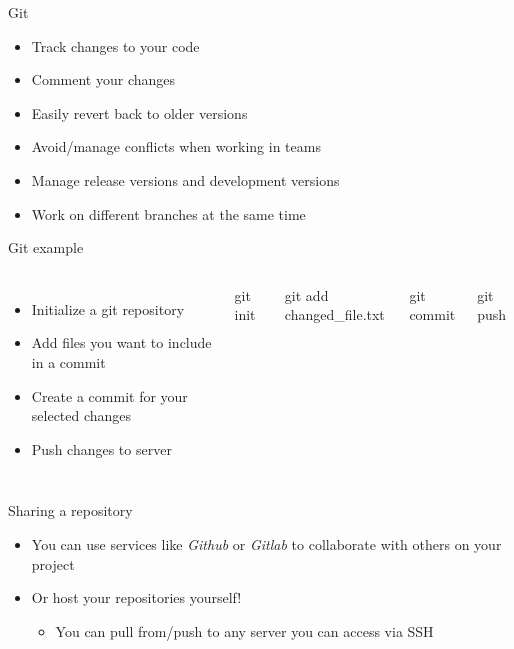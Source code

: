     \begin{frame}[t,fragile]{Git}
        \begin{itemize}
            \item{Track changes to your code}
            \item{Comment your changes}
            \item{Easily revert back to older versions}
            \item{Avoid/manage conflicts when working in teams}
            \item{Manage release versions and development versions}
            \item{Work on different branches at the same time}
        \end{itemize}
    \end{frame}

    \begin{frame}[t,fragile]{Git example}
        \begin{columns}[T]
            \begin{itemize}
                \item{Initialize a git repository}
                \item{Add files you want to include in a commit}
                \item{Create a commit for your selected changes}
                \item{Push changes to server}
            \end{itemize}
        \begin{bashenv}[\small]
git init
        \end{bashenv}
        \begin{bashenv}[\small]
git add changed_file.txt
        \end{bashenv}
        \begin{bashenv}[\small]
git commit
        \end{bashenv}
        \begin{bashenv}[\small]
git push
        \end{bashenv}
        \end{columns}
    \end{frame}

    \begin{frame}[t,fragile]{Sharing a repository}
        \begin{itemize}
            \item{You can use services like \emph{Github} or \emph{Gitlab} to collaborate
                with others on your project}
            \item{Or host your repositories yourself!}
                \begin{itemize}
                    \item{You can pull from/push to any server you can access via SSH}
                \end{itemize}
        \end{itemize}
    \end{frame}

